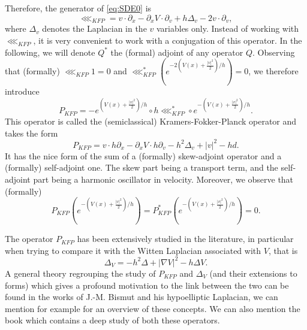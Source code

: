 \documentclass[12pt]{amsart}
\numberwithin{equation}{section}
\numberwithin{figure}{section}
\begin{document}
Therefore, the generator of \eqref{eq:SDE0} is
\begin{equation*}
\lll_{KFP} = v\cdot \partial_x - \partial_x V\cdot \partial_v + h\Delta_v - 2v\cdot\partial_v,
\end{equation*}
where $\Delta_v$ denotes the Laplacian in the $v$ variables only. Instead of working with $\lll_{KFP}$, it is very convenient to work with a conjugation of this operator. In the following, we will denote $Q^*$ the (formal) adjoint of any operator $Q$. Observing that (formally) $\lll_{KFP}1=0$ %
and $\lll_{KFP}^*(e^{-2(V(x) + \frac{|v|^2}{2})/h})=0$, we therefore introduce
\begin{equation*}
P_{KFP} = -e^{(V(x) + \frac{|v|^2}{2})/h}\circ h\lll_{KFP}^*\circ e^{-(V(x) + \frac{|v|^2}{2})/h}.
\end{equation*}
This %
operator is called the (semiclassical) Kramers-Fokker-Planck operator and takes the form
\begin{equation}\label{eq:standardKFP}
P_{KFP} = v\cdot h\partial_x - \partial_x V\cdot h\partial_v - h^2\Delta_v + |v|^2 - hd.
\end{equation}
It has the nice form of the sum of a (formally) skew-adjoint operator and a (formally) self-adjoint one. The skew part being a transport term, and the self-adjoint part being a harmonic oscillator in velocity. Moreover, we observe that (formally)
\begin{equation*}
P_{KFP}(e^{-(V(x) + \frac{|v|^2}{2})/h}) = P_{KFP}^*(e^{-(V(x) + \frac{|v|^2}{2})/h}) = 0.
\end{equation*}

The operator $P_{KFP}$ has been extensively studied in the literature, in particular when trying to compare it with the Witten Laplacian associated with $V$, that is
\begin{equation*}
\Delta_V = -h^2\Delta + |\nabla V|^2 - h\Delta V.
\end{equation*}
A general theory regrouping the study of %
$P_{KFP}$ and $\Delta_V$ (and their extensions to forms) which gives a profound motivation to %
the link between the two can be found in the works of J.-M. Bismut and his hypoelliptic Laplacian, we can mention for example \cite{Bi05,BiLe05} for an overview of these concepts. We can also mention the book \cite{HeNi06} which contains a deep study of both these operators.
\end{document}
